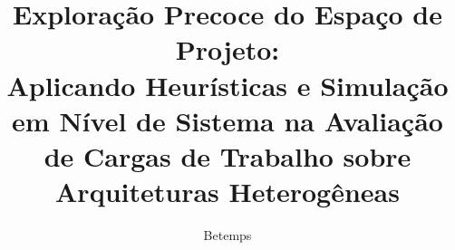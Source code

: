 \documentclass[tese-proposta,nocipinfo]{texufpel}
\title{Exploração Precoce do Espaço de Projeto:\\Aplicando Heurísticas e Simulação em Nível de Sistema na Avaliação\\de Cargas de Trabalho sobre Arquiteturas Heterogêneas}
\author{Betemps}{Carlos Michel}
\begin{document}
\newcommand{\Topico}{\textcolor{red}{>>}\textcolor{red}}

\makeatletter
\newcommand\footnoteref[1]{\protected@xdef\@thefnmark{\ref{#1}}\@footnotemark}
\makeatother

\maketitle 
\sloppy


\begin{abstract}



\end{abstract}
\end{document}
